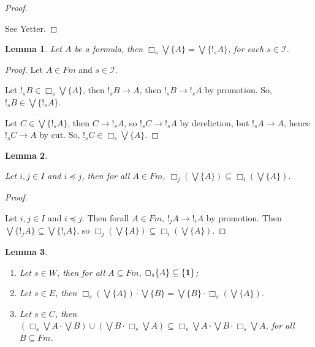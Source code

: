 \documentclass[a4paper]{article}
\theoremstyle{defin}
\theoremstyle{theorem}
\theoremstyle{prop}
\theoremstyle{lemma}
\newtheorem{lemma}{Lemma}
\theoremstyle{ex}
\theoremstyle{col}
\begin{document}
\begin{proof}
$ $

See Yetter.
\end{proof}

\begin{lemma}
  Let $A$ be a formula, then $\Box_s \bigvee \{ A \} = \bigvee \{ !_s A \}$, for each $s \in \mathcal{I}$.
\end{lemma}

\begin{proof}
  Let $A \in Fm$ and $s \in \mathcal{I}$.

  Let $!_s B \in \Box_s \bigvee \{ A \}$, then $!_s B \rightarrow A$, then $!_s B \rightarrow !_s A$
  by promotion. So, $!_s B \in \bigvee \{ !_s A \}$.

  Let $C \in \bigvee \{ !_s A \}$, then $C \rightarrow !_s A$, so $!_s C \rightarrow !_s A$ by dereliction, but $!_s A \rightarrow A$, hence
  $!_s C \rightarrow A$ by cut. So, $!_s C \in \Box_s \bigvee \{ A \}$.
\end{proof}

\begin{lemma}
$ $

  Let $i, j \in I$ and $i \preceq j$, then for all $A \in Fm$, $\Box_j (\bigvee \{ A \}) \subseteq \Box_i (\bigvee \{ A \})$.
\end{lemma}

\begin{proof}
$ $

  Let $i, j \in I$ and $i \preceq j$. Then forall $A \in Fm$, $!_j A \rightarrow !_i A$ by promotion.
  Then $\bigvee \{ !_j A \} \subseteq \bigvee \{ !_i A \}$, so $\Box_j (\bigvee \{ A \}) \subseteq \Box_i (\bigvee \{ A \})$.
\end{proof}

\begin{lemma}
$ $

  \begin{enumerate}
    \item Let $s \in W$, then for all $A \subseteq Fm$, $\Box_s \{ A \} \subseteq \{ {\bf 1} \}$;
    \item Let $s \in E$, then $\Box_s (\bigvee \{ A \}) \cdot \bigvee \{ B \} = \bigvee \{ B\} \cdot \Box_s (\bigvee \{ A \})$.
    \item Let $s \in C$, then $(\Box_s \bigvee A \cdot \bigvee B) \cup (\bigvee B \cdot \Box_s \bigvee A) \subseteq \Box_s \bigvee A \cdot \bigvee B \cdot \Box_s \bigvee A$, for all $B \subseteq Fm$.
  \end{enumerate}
\end{lemma}
\end{document}
